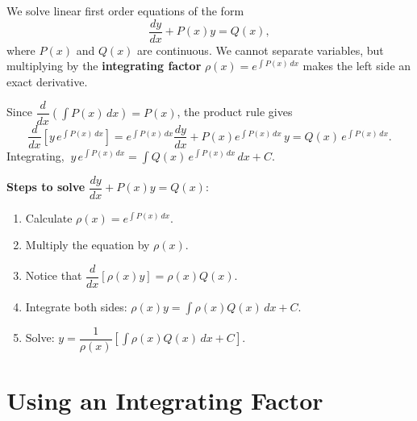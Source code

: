 \documentclass[10pt]{article}
\begin{document}


\bigskip

We solve linear first order equations of the form
\[
    \frac{dy}{dx} + P(x)y = Q(x),
\]
where \(P(x)\) and \(Q(x)\) are continuous. We cannot separate variables, but multiplying by the
\textbf{integrating factor} \(\rho(x) = e^{\int P(x)\,dx}\) makes the left side an exact derivative.

\begin{note}
    Since \(\dfrac{d}{dx}\!\left(\int P(x)\,dx\right) = P(x)\), the product rule gives
    \[
        \frac{d}{dx}\!\left[ y\, e^{\int P(x)\,dx}\right]
        = e^{\int P(x)\,dx}\frac{dy}{dx} + P(x)e^{\int P(x)\,dx}\,y
        = Q(x)\, e^{\int P(x)\,dx}.
    \]
    Integrating, \(\ y\,e^{\int P(x)\,dx} = \int Q(x)\, e^{\int P(x)\,dx}\,dx + C\).
\end{note}

\textbf{Steps to solve} \(\dfrac{dy}{dx} + P(x)y = Q(x)\):
\begin{enumerate}[leftmargin=*, label=\arabic*.]
    \item Calculate \(\rho(x) = e^{\int P(x)\,dx}\).
    \item Multiply the equation by \(\rho(x)\).
    \item Notice that \(\dfrac{d}{dx}\!\left[\rho(x)y\right] = \rho(x)Q(x)\).
    \item Integrate both sides: \(\rho(x)y = \int \rho(x)Q(x)\,dx + C\).
    \item Solve: \(y = \dfrac{1}{\rho(x)}\!\left[\int \rho(x)Q(x)\,dx + C\right]\).
\end{enumerate}

\section{Using an Integrating Factor}
\end{document}
